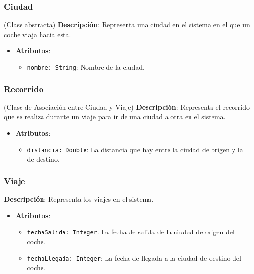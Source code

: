 \documentclass[12pt.a4paper]{article}
\begin{document}
\subsubsection{Ciudad} (Clase abstracta)
\textbf{Descripción}: Representa una ciudad en el sistema en el que un coche viaja hacia esta.

\begin{itemize}
    \item \textbf{Atributos}:
    \begin{itemize}
        \item \texttt{nombre: String}: Nombre de la ciudad.
    \end{itemize}
\end{itemize}

\subsubsection{Recorrido} (Clase de Asociación entre Ciudad y Viaje)
\textbf{Descripción}: Representa el recorrido que se realiza durante un viaje para ir de una ciudad a otra en el sistema.

\begin{itemize}
    \item \textbf{Atributos}:
    \begin{itemize}
        \item \texttt{distancia: Double}: La distancia que hay entre la ciudad de origen y la de destino.
    \end{itemize}
\end{itemize}

\subsubsection{Viaje}
\textbf{Descripción}:  Representa los viajes en el sistema. 

\begin{itemize}
    \item \textbf{Atributos}:
    \begin{itemize}
        \item \texttt{fechaSalida: Integer}: La fecha de salida de la ciudad de origen del coche.
        \item \texttt{fechaLlegada: Integer}: La fecha de llegada a la ciudad de destino del coche.
    \end{itemize}
\end{itemize}

\vspace{2.0cm} %
\end{document}
